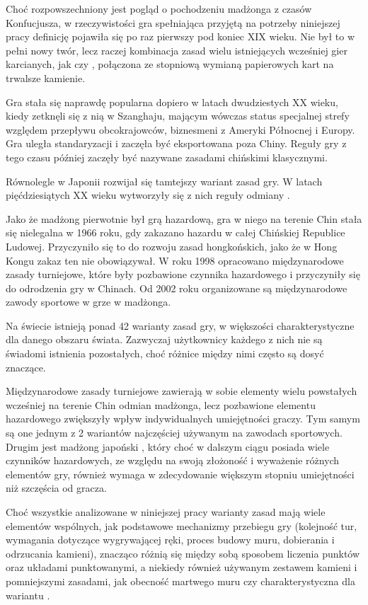 \summary
Choć rozpowszechniony jest pogląd o pochodzeniu madżonga z czasów Konfucjusza, w
rzeczywistości gra spełniająca przyjętą na potrzeby niniejszej pracy definicję
pojawiła się po raz pierwszy pod koniec XIX wieku. Nie był to w pełni nowy
twór, lecz raczej kombinacja zasad wielu istniejących wcześniej gier karcianych,
jak  czy , połączona ze stopniową wymianą
papierowych kart na trwalsze kamienie.

Gra stała się naprawdę popularna dopiero w latach dwudziestych XX wieku, kiedy
zetknęli się z nią w Szanghaju, mającym wówczas status specjalnej strefy
względem przepływu obcokrajowców, biznesmeni z Ameryki Północnej i Europy. Gra
uległa standaryzacji i zaczęła być eksportowana poza Chiny. Reguły gry z tego
czasu później zaczęły być nazywane zasadami chińskimi klasycznymi. 

Równolegle w Japonii rozwijał się tamtejszy wariant zasad gry. W latach
pięćdziesiątych XX wieku wytworzyły się z nich reguły odmiany .

Jako że madżong pierwotnie był grą hazardową, gra w niego na terenie Chin stała
się nielegalna w 1966 roku, gdy zakazano hazardu w całej Chińskiej Republice
Ludowej. Przyczyniło się to do rozwoju zasad hongkońskich, jako że w Hong Kongu
zakaz ten nie obowiązywał. W roku 1998 opracowano międzynarodowe zasady turniejowe,
które były pozbawione czynnika hazardowego i przyczyniły się do odrodzenia gry w
Chinach. Od 2002 roku organizowane są międzynarodowe zawody sportowe
w grze w madżonga.

Na świecie istnieją ponad 42 warianty zasad gry, w większości charakterystyczne
dla danego obszaru świata. Zazwyczaj użytkownicy każdego z nich nie są świadomi
istnienia pozostałych, choć różnice między nimi często są dosyć znaczące.

Międzynarodowe zasady turniejowe zawierają w sobie elementy wielu powstałych
wcześniej na terenie Chin odmian madżonga, lecz pozbawione elementu hazardowego
zwiększyły wpływ indywidualnych umiejętności graczy. Tym samym są one jednym z 2
wariantów najczęściej używanym na zawodach sportowych. Drugim jest madżong
japoński , który choć w dalszym ciągu posiada wiele czynników
hazardowych, ze względu na swoją złożoność i wyważenie różnych elementów gry,
również wymaga w zdecydowanie większym stopniu umiejętności niż szczęścia od
gracza. 

Choć wszystkie analizowane w niniejszej pracy warianty zasad mają wiele
elementów wspólnych, jak podstawowe mechanizmy przebiegu gry (kolejność tur,
wymagania dotyczące wygrywającej ręki, proces budowy muru, dobierania i
odrzucania kamieni), znacząco różnią się między sobą sposobem liczenia punktów
oraz układami punktowanymi, a niekiedy również używanym zestawem kamieni i
pomniejszymi zasadami, jak obecność martwego muru czy charakterystyczna dla
wariantu  .


